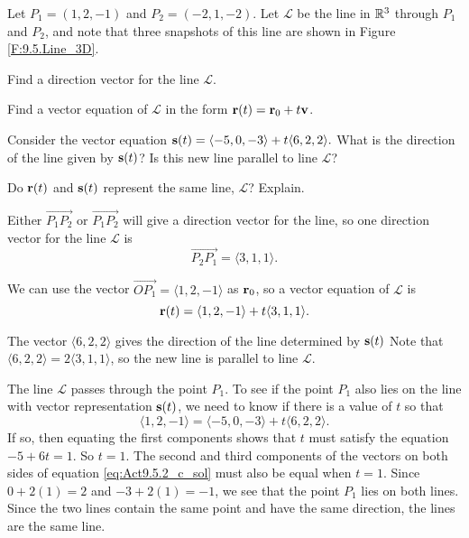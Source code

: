 	

\begin{activity} \label{A:9.5.2}  Let $P_1 = (1,2,-1)$ and $P_2 = (-2,1,-2)$. Let $\mathcal{L}$ be the line in $\mathbb{R}^3$ through $P_1$ and $P_2$, and note that three snapshots of this line are shown in Figure \ref{F:9.5.Line_3D}.
	\ba
	\item Find a direction vector for the line $\mathcal{L}$.
	
	\item Find a vector equation of $\mathcal{L}$ in the form $\mathbf{r}(t) = \mathbf{r}_0 + t\mathbf{v}$.
	
	\item Consider the vector equation $\mathbf{s}(t) = \langle -5, 0, -3 \rangle + t \langle 6, 2, 2 \rangle.$  What is the direction of the line given by $\mathbf{s}(t)$?  Is this new line parallel to line $\mathcal{L}$?
	
	\item Do $\mathbf{r}(t)$ and $\mathbf{s}(t)$ represent the same line, $\mathcal{L}$?  Explain.
	
	\ea


\end{activity}
\begin{smallhint}

\end{smallhint}
\begin{bighint}

\end{bighint}
\begin{activitySolution}
	\ba
	\item Either $\overrightarrow{P_1P_2}$ or $\overrightarrow{P_1P_2}$ will give a direction vector for the line, so one direction vector for the line $\mathcal{L}$ is 
\[\overrightarrow{P_2P_1} = \langle 3, 1, 1 \rangle.\]
	\item We can use the vector $\overrightarrow{OP_1} = \langle 1,2,-1\rangle$ as $\mathbf{r}_0$, so a vector equation of $\mathcal{L}$ is
\[\mathbf{r}(t) = \langle 1,2,-1\rangle + t\langle 3, 1, 1 \rangle.\]
	\item The vector $\langle 6, 2, 2 \rangle$ gives the direction of the line determined by $\mathbf{s}(t)$ Note that $\langle 6, 2, 2 \rangle = 2 \langle 3, 1, 1 \rangle$, so the new line is parallel to line $\mathcal{L}$.
	\item The line $\mathcal{L}$ passes through the point $P_1$. To see if the point $P_1$ also lies on the line with vector representation $\mathbf{s}(t)$, we need to know if there is a value of $t$ so that 
\begin{equation} \label{eq:Act9.5.2_c_sol}
\langle 1,2,-1\rangle = \langle -5, 0, -3 \rangle + t \langle 6, 2, 2 \rangle.
\end{equation}
If so, then equating the first components shows that $t$ must satisfy the equation $-5+6t=1$. So $t=1$. The second and third components of the  vectors on both sides of equation \ref{eq:Act9.5.2_c_sol} must also be equal when $t=1$. Since $0+2(1) = 2$ and $-3+2(1)=-1$, we see that the point $P_1$ lies on both lines. Since the two lines contain the same point and have the same direction, the lines are the same line. 	
	\ea
\end{activitySolution}
\aftera
